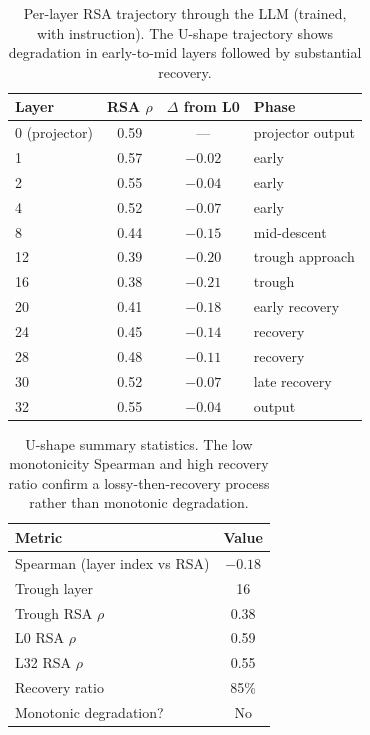 \documentclass[letterpaper]{article}
\begin{document}
\begin{table}[t]
\centering
\caption{Per-layer RSA trajectory through the LLM (trained, with instruction). The U-shape trajectory shows degradation in early-to-mid layers followed by substantial recovery.}
\label{tab:perlayer}
\small
\begin{tabular}{lccl}
\toprule
\textbf{Layer} & \textbf{RSA $\rho$} & \textbf{$\Delta$ from L0} & \textbf{Phase} \\
\midrule
0 (projector) & 0.59 & --- & projector output \\
1  & 0.57 & $-0.02$ & early \\
2  & 0.55 & $-0.04$ & early \\
4  & 0.52 & $-0.07$ & early \\
8  & 0.44 & $-0.15$ & mid-descent \\
12 & 0.39 & $-0.20$ & trough approach \\
16 & 0.38 & $-0.21$ & trough \\
20 & 0.41 & $-0.18$ & early recovery \\
24 & 0.45 & $-0.14$ & recovery \\
28 & 0.48 & $-0.11$ & recovery \\
30 & 0.52 & $-0.07$ & late recovery \\
32 & 0.55 & $-0.04$ & output \\
\bottomrule
\end{tabular}
\end{table}

\begin{table}[t]
\centering
\caption{U-shape summary statistics. The low monotonicity Spearman and high recovery ratio confirm a lossy-then-recovery process rather than monotonic degradation.}
\label{tab:ushape}
\small
\begin{tabular}{lc}
\toprule
\textbf{Metric} & \textbf{Value} \\
\midrule
Spearman (layer index vs RSA) & $-0.18$ \\
Trough layer & 16 \\
Trough RSA $\rho$ & 0.38 \\
L0 RSA $\rho$ & 0.59 \\
L32 RSA $\rho$ & 0.55 \\
Recovery ratio & 85\% \\
Monotonic degradation? & No \\
\bottomrule
\end{tabular}
\end{table}
\end{document}
